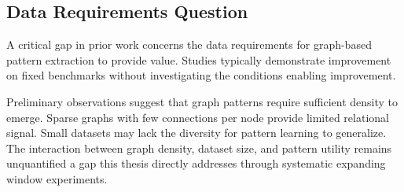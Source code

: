 \subsection{Data Requirements Question}

A critical gap in prior work concerns the data requirements for graph-based pattern extraction to provide value. Studies typically demonstrate improvement on fixed benchmarks without investigating the conditions enabling improvement.

Preliminary observations suggest that graph patterns require sufficient density to emerge. Sparse graphs with few connections per node provide limited relational signal. Small datasets may lack the diversity for pattern learning to generalize. The interaction between graph density, dataset size, and pattern utility remains unquantified a gap this thesis directly addresses through systematic expanding window experiments.
